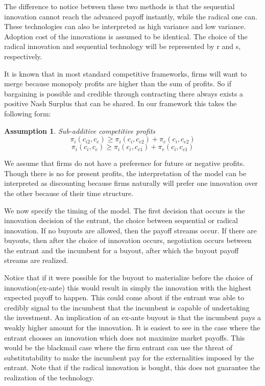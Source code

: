 \documentclass[11pt]{article}
\newtheorem{assumption}{Assumption}
\begin{document}

The difference to notice between these two methods is that the sequential innovation cannot reach the advanced payoff instantly, while the radical one can. These technologies can also be interpreted as high variance and low variance. Adoption cost of the innovations is assumed to be identical. The choice of the radical innovation and sequential technology will be represented by r and s, respectively.  


It is known that in most standard competitive frameworks, firms will want to merge because monopoly profits are higher than the sum of profits. So if bargaining is possible and credible through contracting there always exists a positive Nash Surplus that can be shared. In our framework this takes the following form: 

\begin{assumption}{Sub-additive competitive profits}
\begin{equation*}
\pi_{i}(c_{i2},c_{e}) \geq  \pi_{i}(c_{i},c_{e2}) + \pi_{e}(c_{i},c_{e2})
\end{equation*}
\begin{equation*}
\pi_{i}(c_{i},c_{e}) \geq  \pi_{i}(c_{i},c_{e1}) + \pi_{e}(c_{i},c_{e1})
\end{equation*}
\end{assumption}


We assume that firms do not have a preference for future or negative profits. Though there is no  for present profits, the interpretation of the model can be interpreted as discounting because firms naturally will prefer one innovation over the other because of their time structure. 

We now specify the timing of the model. The first decision that occurs is the innovation decision of the entrant, the choice between sequential or radical innovation. If no buyouts are allowed, then the payoff streams occur. If there are buyouts, then after the choice of innovation occurs, negotiation occurs between the entrant and the incumbent for a buyout, after which the buyout payoff streams are realized.

Notice that if it were possible for the buyout to materialize before the choice of innovation(ex-ante) this would result in simply the innovation with the highest expected payoff to happen. This could come about if the entrant was able to credibly signal to the incumbent that the incumbent is capable of undertaking the investment. An implication of an ex-ante buyout is that the incumbent pays a weakly higher amount for the innovation. It is easiest to see in the case where the entrant chooses an innovation which does not maximize market payoffs. This would be the blackmail case where the firm entrant can use the threat of substitutability to make the incumbent pay for the externalities imposed by the entrant. Note that if the radical innovation is bought, this does not guarantee the realization of the technology. 
\end{document}
